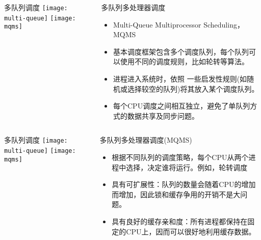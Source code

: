 \begin{frame}
	\begin{columns}
		\begin{column}{.5\textwidth}
			\Large \centering
			多队列调度
			\texttt{[image: multi-queue]}
			\texttt{[image: mqms]}	
		\end{column}
		
		\begin{column}{.5\textwidth}
			\large
			多队列多处理器调度 \\
			\normalsize
			\begin{itemize}
			\item Multi-Queue Multiprocessor Scheduling，MQMS
			\item 基本调度框架包含多个调度队列，每个队列可以使用不同的调度规则，比如轮转等算法。
			
			\item 进程进入系统时，依照 一些启发性规则(如随机或选择较空的队列)将其放入某个调度队列。
			\item 每个CPU调度之间相互独立，避免了单队列方式的数据共享及同步问题。
			\end{itemize}
		\end{column}
	\end{columns}
\end{frame}


\begin{frame}
	\begin{columns}
		\begin{column}{.5\textwidth}
			\Large \centering
			多队列调度
			\texttt{[image: multi-queue]}
			\texttt{[image: mqms]}	
		\end{column}
		
		\begin{column}{.5\textwidth}
			\large
			多队列多处理器调度(MQMS) 
			\normalsize
			\begin{itemize}
			\item 根据不同队列的调度策略，每个CPU从两个进程中选择，决定谁将运行。例如，轮转调度
			\item 具有可扩展性：队列的数量会随着CPU的增加而增加，因此锁和缓存争用的开销不是大问题。
			\item 具有良好的缓存亲和度：所有进程都保持在固定的CPU上，因而可以很好地利用缓存数据。
			\end{itemize}
		\end{column}
	\end{columns}
\end{frame}


